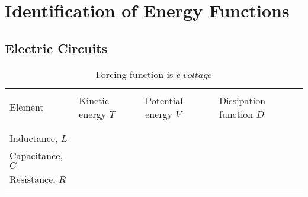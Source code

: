 \chapter[Identification of Energy Functions]{Identification of Energy Functions}

 
\renewcommand{\row}[4]{
	\small #1 & \small #2 & \small #3 & \small #4\\
}
\renewcommand{\separation}{
			\multicolumn{4}{c}{}\\[-1em]
	        \hline
	        \multicolumn{4}{c}{}\\[-1em]
}

% 		        
% 		        

\section{Electric Circuits}

\begin{table}[h]
	\caption[Circuits (Mesh)]{Forcing function is $e\ voltage$}
	 	\begin{tabular}{>{\centering\arraybackslash}m{2cm} | >{\centering\arraybackslash}m{2cm} | >{\centering\arraybackslash}m{2.2cm} | >{\centering\arraybackslash}m{2.8cm}}
		        \hline
		        \multicolumn{4}{c}{}\\[-1em]
		        \row{Element}{Kinetic energy $T$}{Potential energy $V$}{Dissipation function $D$}
		        \separation
		        
		        \row{Inductance, $L$}{  }{\textemdash}{\textemdash}
		        \row{Capacitance, $C$}{\textemdash}{  }{\textemdash}
		        \row{Resistance, $R$}{\textemdash}{\textemdash}{  }
		        
		        \multicolumn{4}{c}{}\\[-1em]
		        \hline
		    \end{tabular}
\end{table}

